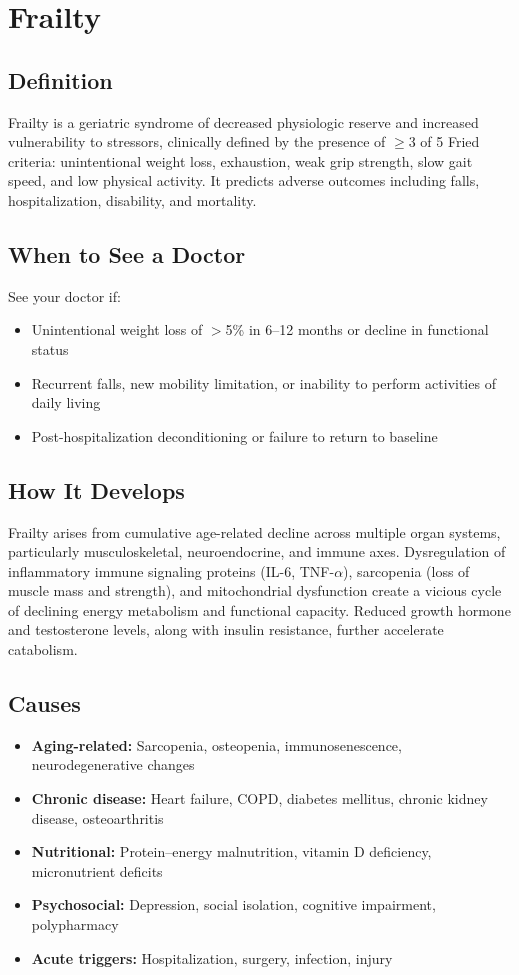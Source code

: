 \chapter{Frailty}

\section*{Definition}
Frailty is a geriatric syndrome of decreased physiologic reserve and increased vulnerability to stressors, clinically defined by the presence of \ensuremath{\geq}3 of 5 Fried criteria: unintentional weight loss, exhaustion, weak grip strength, slow gait speed, and low physical activity. It predicts adverse outcomes including falls, hospitalization, disability, and mortality.

\section*{When to See a Doctor}
See your doctor if:
\begin{itemize}
  \item Unintentional weight loss of \ensuremath{>}5\% in 6--12 months or decline in functional status
  \item Recurrent falls, new mobility limitation, or inability to perform activities of daily living
  \item Post-hospitalization deconditioning or failure to return to baseline
\end{itemize}

\section*{How It Develops}
Frailty arises from cumulative age-related decline across multiple organ systems, particularly musculoskeletal, neuroendocrine, and immune axes. Dysregulation of inflammatory immune signaling proteins (IL-6, TNF-\ensuremath{\alpha}), sarcopenia (loss of muscle mass and strength), and mitochondrial dysfunction create a vicious cycle of declining energy metabolism and functional capacity. Reduced growth hormone and testosterone levels, along with insulin resistance, further accelerate catabolism.

\section*{Causes}
\begin{itemize}
  \item \textbf{Aging-related:} Sarcopenia, osteopenia, immunosenescence, neurodegenerative changes
  \item \textbf{Chronic disease:} Heart failure, COPD, diabetes mellitus, chronic kidney disease, osteoarthritis
  \item \textbf{Nutritional:} Protein--energy malnutrition, vitamin D deficiency, micronutrient deficits
  \item \textbf{Psychosocial:} Depression, social isolation, cognitive impairment, polypharmacy
  \item \textbf{Acute triggers:} Hospitalization, surgery, infection, injury
\end{itemize}

